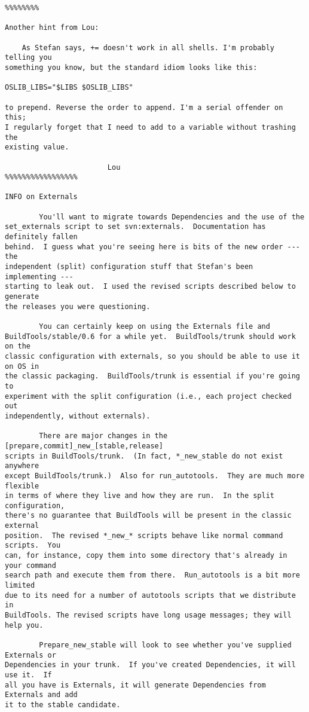 \begin{verbatim}
%%%%%%%%

Another hint from Lou:

	As Stefan says, += doesn't work in all shells. I'm probably telling you
something you know, but the standard idiom looks like this:

OSLIB_LIBS="$LIBS $OSLIB_LIBS"

to prepend. Reverse the order to append. I'm a serial offender on this;
I regularly forget that I need to add to a variable without trashing the
existing value.

						Lou
%%%%%%%%%%%%%%%%%

INFO on Externals

        You'll want to migrate towards Dependencies and the use of the
set_externals script to set svn:externals.  Documentation has definitely fallen
behind.  I guess what you're seeing here is bits of the new order --- the
independent (split) configuration stuff that Stefan's been implementing ---
starting to leak out.  I used the revised scripts described below to generate
the releases you were questioning.

        You can certainly keep on using the Externals file and
BuildTools/stable/0.6 for a while yet.  BuildTools/trunk should work on the
classic configuration with externals, so you should be able to use it on OS in
the classic packaging.  BuildTools/trunk is essential if you're going to
experiment with the split configuration (i.e., each project checked out
independently, without externals).

        There are major changes in the [prepare,commit]_new_[stable,release]
scripts in BuildTools/trunk.  (In fact, *_new_stable do not exist anywhere
except BuildTools/trunk.)  Also for run_autotools.  They are much more flexible
in terms of where they live and how they are run.  In the split configuration,
there's no guarantee that BuildTools will be present in the classic external
position.  The revised *_new_* scripts behave like normal command scripts.  You
can, for instance, copy them into some directory that's already in your command
search path and execute them from there.  Run_autotools is a bit more limited
due to its need for a number of autotools scripts that we distribute in
BuildTools. The revised scripts have long usage messages; they will help you.

        Prepare_new_stable will look to see whether you've supplied Externals or
Dependencies in your trunk.  If you've created Dependencies, it will use it.  If
all you have is Externals, it will generate Dependencies from Externals and add
it to the stable candidate.


\end{verbatim}
